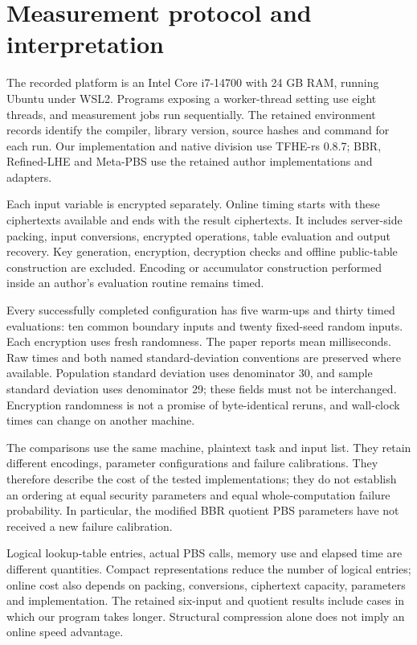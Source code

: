 \documentclass[11pt,a4paper]{article}
\begin{document}
\section*{Measurement protocol and interpretation}
The recorded platform is an Intel Core i7-14700 with 24 GB RAM, running Ubuntu under WSL2. Programs exposing a worker-thread setting use eight threads, and measurement jobs run sequentially. The retained environment records identify the compiler, library version, source hashes and command for each run. Our implementation and native division use TFHE-rs 0.8.7; BBR, Refined-LHE and Meta-PBS use the retained author implementations and adapters.

Each input variable is encrypted separately. Online timing starts with these ciphertexts available and ends with the result ciphertexts. It includes server-side packing, input conversions, encrypted operations, table evaluation and output recovery. Key generation, encryption, decryption checks and offline public-table construction are excluded. Encoding or accumulator construction performed inside an author's evaluation routine remains timed.

Every successfully completed configuration has five warm-ups and thirty timed evaluations: ten common boundary inputs and twenty fixed-seed random inputs. Each encryption uses fresh randomness. The paper reports mean milliseconds. Raw times and both named standard-deviation conventions are preserved where available. Population standard deviation uses denominator 30, and sample standard deviation uses denominator 29; these fields must not be interchanged. Encryption randomness is not a promise of byte-identical reruns, and wall-clock times can change on another machine.

The comparisons use the same machine, plaintext task and input list. They retain different encodings, parameter configurations and failure calibrations. They therefore describe the cost of the tested implementations; they do not establish an ordering at equal security parameters and equal whole-computation failure probability. In particular, the modified BBR quotient PBS parameters have not received a new failure calibration.

Logical lookup-table entries, actual PBS calls, memory use and elapsed time are different quantities. Compact representations reduce the number of logical entries; online cost also depends on packing, conversions, ciphertext capacity, parameters and implementation. The retained six-input and quotient results include cases in which our program takes longer. Structural compression alone does not imply an online speed advantage.
\end{document}
